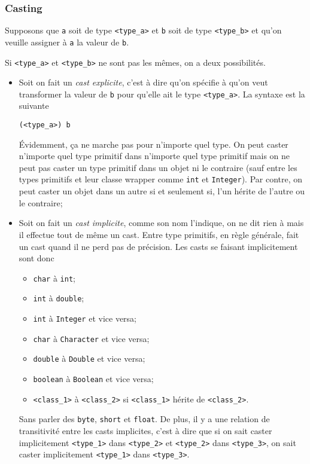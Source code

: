 \subsubsection{Casting}
Supposons que \lstinline|a| soit de type \lstinline|<type_a>| et \lstinline|b|
soit de type \lstinline|<type_b>| et
qu'on veuille assigner à \lstinline|a| la valeur de \lstinline|b|.

Si \lstinline|<type_a>| et \lstinline|<type_b>| ne sont pas les mêmes, on a deux
possibilités.
\begin{itemize}
  \item Soit on fait un \emph{cast explicite}, c'est à dire qu'on
    spécifie à \java{} qu'on veut transformer la valeur de \lstinline|b| pour
    qu'elle ait le type \lstinline|<type_a>|. La syntaxe est la suivante
    \begin{lstlisting}
(<type_a>) b
    \end{lstlisting}
    Évidemment, ça ne marche pas pour n'importe quel type.
    On peut caster n'importe quel type primitif dans n'importe quel type
    primitif mais on ne peut pas caster un type primitif dans un objet ni
    le contraire (sauf entre les types primitifs et leur classe wrapper comme
    \lstinline|int| et \lstinline|Integer|).
    Par contre, on peut caster un objet dans un autre si et seulement si,
    l'un hérite de l'autre ou le contraire;
  \item Soit on fait un \emph{cast implicite}, comme son nom l'indique,
    on ne dit rien à \java{} mais il effectue tout de même un cast.
    Entre type primitifs, en règle générale,
    \java{} fait un cast quand il ne perd pas de précision.
    Les casts se faisant implicitement sont donc
    \begin{itemize}
      \item \lstinline|char| à \lstinline|int|;
      \item \lstinline|int| à \lstinline|double|;
      \item \lstinline|int| à \lstinline|Integer| et vice versa;
      \item \lstinline|char| à \lstinline|Character| et vice versa;
      \item \lstinline|double| à \lstinline|Double| et vice versa;
      \item \lstinline|boolean| à \lstinline|Boolean| et vice versa;
      \item \lstinline|<class_1>| à \lstinline|<class_2>|
        si \lstinline|<class_1>| hérite de \lstinline|<class_2>|.
    \end{itemize}
    Sans parler des \lstinline|byte|, \lstinline|short| et \lstinline|float|.
    De plus, il y a une relation de transitivité entre les casts
    implicites, c'est à dire que si on sait caster implicitement
    \lstinline|<type_1>| dans \lstinline|<type_2>| et
    \lstinline|<type_2>| dans \lstinline|<type_3>|, on sait caster implicitement
    \lstinline|<type_1>| dans \lstinline|<type_3>|.
\end{itemize}

